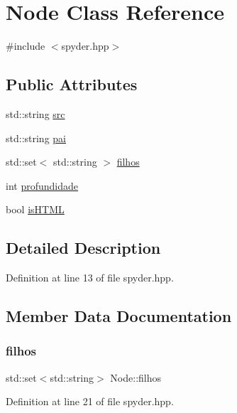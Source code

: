 \hypertarget{class_node}{}\section{Node Class Reference}
\label{class_node}


{\ttfamily \#include $<$spyder.\+hpp$>$}

\subsection*{Public Attributes}
\begin{DoxyCompactItemize}
\item 
std\+::string \hyperlink{class_node_a3289d1424d00ed56a69fbabfccb58e1a}{src}
\item 
std\+::string \hyperlink{class_node_ae6797ec35c3b1f6f2979a843c7e3264c}{pai}
\item 
std\+::set$<$ std\+::string $>$ \hyperlink{class_node_a64d057e3d01065cd747902803de2c93e}{filhos}
\item 
int \hyperlink{class_node_aa55ce33b2cf5a6d05435b1c8ca859e5d}{profundidade}
\item 
bool \hyperlink{class_node_a5fc7e716b667a4ec77c760a819a8adab}{is\+H\+T\+ML}
\end{DoxyCompactItemize}


\subsection{Detailed Description}


Definition at line 13 of file spyder.\+hpp.



\subsection{Member Data Documentation}
\mbox{\label{class_node_a64d057e3d01065cd747902803de2c93e}} 
\subsubsection{\texorpdfstring{filhos}{filhos}}
{\footnotesize\ttfamily std\+::set$<$std\+::string$>$ Node\+::filhos}



Definition at line 21 of file spyder.\+hpp.

\mbox{\label{class_node_a5fc7e716b667a4ec77c760a819a8adab}} 
